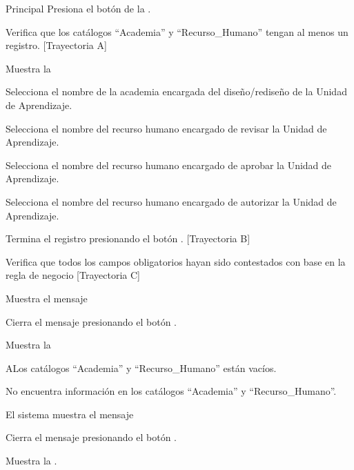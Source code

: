 \begin{UCtrayectoria}{Principal}
    \UCpaso[\UCactor] Presiona el botón  de la .
    
    \UCpaso Verifica que los catálogos ``Academia'' y ``Recurso\_Humano'' tengan al menos un registro. [Trayectoria A]
    
    \UCpaso Muestra la 
    
    \UCpaso[\UCactor] Selecciona el nombre de la academia encargada del diseño/rediseño de la Unidad de Aprendizaje. 
    
    \UCpaso[\UCactor] Selecciona el nombre del recurso humano encargado de revisar la Unidad de Aprendizaje.
    
    \UCpaso[\UCactor] Selecciona el nombre del recurso humano encargado de aprobar la Unidad de Aprendizaje.
    
    \UCpaso[\UCactor] Selecciona el nombre del recurso humano encargado de autorizar la Unidad de Aprendizaje.
    
    \UCpaso[\UCactor] Termina el registro presionando el botón . [Trayectoria B]
    
    \UCactor Verifica que todos los campos obligatorios hayan sido contestados con base en la regla de negocio  [Trayectoria C]
    
    \UCpaso Muestra el mensaje 
    
    \UCpaso[\UCactor] Cierra el mensaje presionando el botón .
    
    \UCpaso Muestra la 
\end{UCtrayectoria}


\begin{UCtrayectoriaA}{A}{Los catálogos ``Academia'' y ``Recurso\_Humano'' están vacíos.}

    \UCpaso No encuentra información en los catálogos ``Academia'' y ``Recurso\_Humano''.
    
    \UCpaso El sistema muestra el mensaje 
    
    \UCpaso[\UCactor] Cierra el mensaje presionando el botón .
    
    \UCpaso Muestra la .
\end{UCtrayectoriaA}

